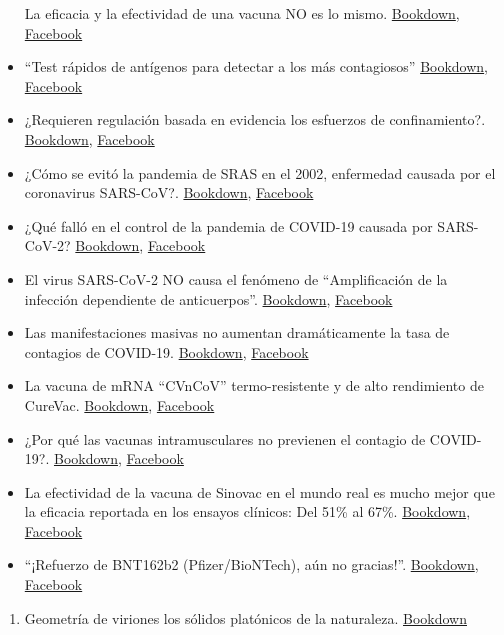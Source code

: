 \documentclass[
  12pt, krantz2,
  spanish,
]{krantz}
\providecommand{\tightlist}{%
  \setlength{\itemsep}{0pt}\setlength{\parskip}{0pt}}
\begin{document}
\begin{itemize}
  La eficacia y la efectividad de una vacuna NO es lo mismo. \href{}{Bookdown}, \href{https://www.facebook.com/permalink.php?story_fbid=285011853223636\&id=107088044349352}{Facebook}
\item
  ``Test rápidos de antígenos para detectar a los más contagiosos'' \href{}{Bookdown}, \href{https://www.facebook.com/permalink.php?story_fbid=285058139885674\&id=107088044349352}{Facebook}
\item
  ¿Requieren regulación basada en evidencia los esfuerzos de confinamiento?. \href{}{Bookdown}, \href{https://www.facebook.com/BioViral/videos/442313850196495/}{Facebook}
\item
  ¿Cómo se evitó la pandemia de SRAS en el 2002, enfermedad causada por el coronavirus SARS-CoV?. \href{}{Bookdown}, \href{https://www.facebook.com/BioViral/posts/155212829939368}{Facebook}
\item
  ¿Qué falló en el control de la pandemia de COVID-19 causada por SARS-CoV-2? \href{}{Bookdown}, \href{https://www.facebook.com/BioViral/posts/171521324975185}{Facebook}
\item
  El virus SARS-CoV-2 NO causa el fenómeno de ``Amplificación de la infección dependiente de anticuerpos''. \href{}{Bookdown}, \href{https://www.facebook.com/BioViral/posts/175339871259997}{Facebook}
\item
  Las manifestaciones masivas no aumentan dramáticamente la tasa de contagios de COVID-19. \href{}{Bookdown}, \href{https://www.facebook.com/BioViral/posts/175382534589064}{Facebook}
\item
  La vacuna de mRNA ``CVnCoV'' termo-resistente y de alto rendimiento de CureVac. \href{}{Bookdown}, \href{https://www.facebook.com/BioViral/posts/185658043561513}{Facebook}
\item
  ¿Por qué las vacunas intramusculares no previenen el contagio de COVID-19?. \href{}{Bookdown}, \href{https://www.facebook.com/BioViral/posts/201146022012715}{Facebook}
\item
  La efectividad de la vacuna de Sinovac en el mundo real es mucho mejor que la eficacia reportada en los ensayos clínicos: Del 51\% al 67\%. \href{}{Bookdown}, \href{https://www.facebook.com/BioViral/posts/202619181865399}{Facebook}
\item
  ``¡Refuerzo de BNT162b2 (Pfizer/BioNTech), aún no gracias!''. \href{}{Bookdown}, \href{https://www.facebook.com/BioViral/posts/206887918105192}{Facebook}
\end{itemize}

\begin{enumerate}
\def\labelenumi{\arabic{enumi}.}
\setcounter{enumi}{7}
\tightlist
\item
  Geometría de viriones los sólidos platónicos de la naturaleza. \href{}{Bookdown}
\end{enumerate}
\end{document}
